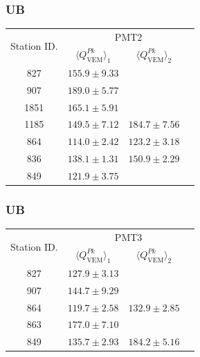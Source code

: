 \documentclass[aspectratio=169]{beamer}
\begin{document}
\begin{frame}
  \frametitle{UB}
  \footnotesize
  \begin{tabular}{c|c|c|c} \hline
    \multirow{2}{*}{Station ID.} & \multicolumn{3}{c}{PMT2} \\
    \cline{2-4}
    & $\langle Q^{Pk}_{\mathrm{VEM}} \rangle_1$ &
    $\langle Q^{Pk}_{\mathrm{VEM}} \rangle_2$ &  \\
    \cline{1-4}
    827 & $155.9\pm9.33$ & &
    \\ \hline
    907 & $189.0\pm5.77$ & &
    \\ \hline
    1851 & $165.1\pm5.91$ & &
    \\ \hline
    1185 & $149.5\pm7.12$ & $184.7\pm7.56$ & 
    \\ \hline
    864 & $114.0\pm2.42$ & $123.2\pm3.18$ & 
    \\ \hline 
    836 & $138.1\pm1.31$ & $150.9\pm2.29$ &
    \\ \hline
    849 & $121.9\pm3.75$ & &
    \\ \hline
  \end{tabular}
\end{frame}

\begin{frame}
  \frametitle{UB}
  \footnotesize
  \begin{tabular}{c|c|c|c} \hline
    \multirow{2}{*}{Station ID.} & \multicolumn{3}{c}{PMT3} \\
    \cline{2-4}
    & $\langle Q^{Pk}_{\mathrm{VEM}} \rangle_1$ &
    $\langle Q^{Pk}_{\mathrm{VEM}} \rangle_2$ &  \\
    \cline{1-4}
    827 & $127.9\pm3.13$ & &
    \\ \hline
    907 & $144.7\pm9.29$ & &
    \\ \hline
    864 & $119.7\pm2.58$ & $132.9\pm2.85$ & 
    \\ \hline
    863 & $177.0\pm7.10$ & &
    \\ \hline
    849 & $135.7\pm2.93$ & $184.2\pm5.16$ &
    \\ \hline
  \end{tabular}
\end{frame}
\end{document}
